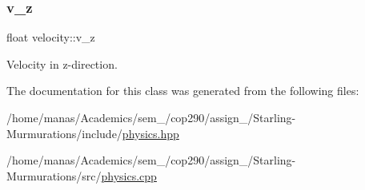 \subsubsection{\texorpdfstring{v\+\_\+z}{v\_z}}
{\footnotesize\ttfamily float velocity\+::v\+\_\+z}



Velocity in z-\/direction. 



The documentation for this class was generated from the following files\+:\begin{DoxyCompactItemize}
\item 
/home/manas/\+Academics/sem\+\_/cop290/assign\+\_/\+Starling-\/\+Murmurations/include/\mbox{\hyperlink{physics_8hpp}{physics.\+hpp}}\item 
/home/manas/\+Academics/sem\+\_/cop290/assign\+\_/\+Starling-\/\+Murmurations/src/\mbox{\hyperlink{physics_8cpp}{physics.\+cpp}}\end{DoxyCompactItemize}
